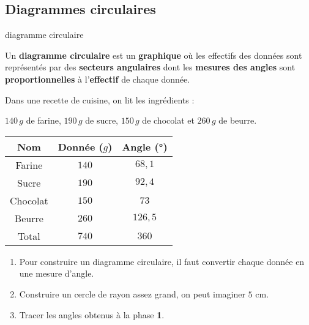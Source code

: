 \begin{pageCours} 

\section{Diagrammes circulaires}
\begin{DefT}{diagramme circulaire}

Un \textbf{diagramme circulaire} est un \textbf{graphique} où les effectifs des données sont représentés par des \textbf{secteurs angulaires} dont les \textbf{mesures des angles} sont \textbf{proportionnelles} à l'\textbf{effectif} de chaque donnée. 

\end{DefT}

\begin{Ex}

Dans une recette de cuisine, on lit les ingrédients :

$140\,g$ de farine, $190\,g$ de sucre, $150\,g$ de chocolat et $260\,g$ de beurre.

\begin{minipage}{0.48\linewidth}

\begin{tabular}{|c|c|c|}\hline
Nom & Donnée ($g$) & Angle (°) \\\hline
Farine &  \textcolor{sacado_violet}{$140$} & $68,1$ \\\hline
Sucre & \textcolor{bleu2}{$190$} & $92,4$ \\\hline
Chocolat &  \textcolor{sacado_yellow}{$150$} &  $73$ \\\hline
Beurre & \textcolor{sacado_orange}{$260$} & $126,5$ \\\hline
Total & $740$ &  $360$ \\\hline
\end{tabular}
\end{minipage}
\begin{minipage}{0.48\linewidth}
\end{minipage}

\end{Ex}


\begin{Mt}

\begin{enumerate}[leftmargin=*]
\item Pour construire un diagramme circulaire, il faut convertir chaque donnée en une mesure d'angle.
\item Construire un cercle de rayon assez grand, on peut imaginer $5$ cm.
\item Tracer les angles obtenus à la phase \textbf{1}. 
\end{enumerate}
 
\end{Mt}


\end{pageCours}


